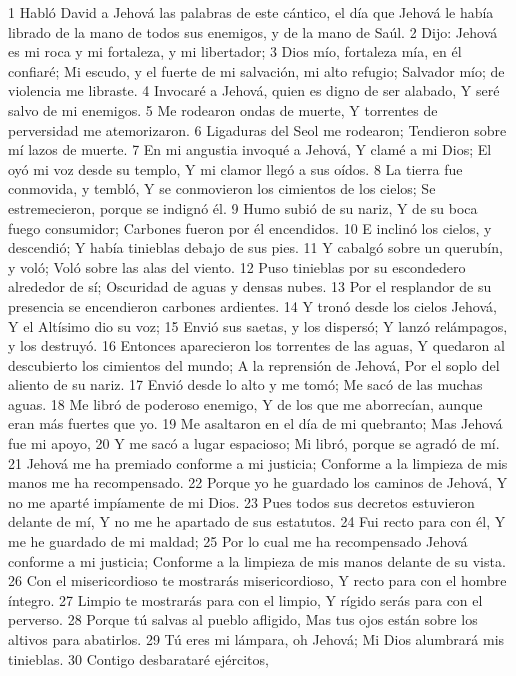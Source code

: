 1 Habló David a Jehová las palabras de este cántico, el día que Jehová le había librado de la mano de todos sus enemigos, y de la mano de Saúl.
2 Dijo:
Jehová es mi roca y mi fortaleza, y mi libertador;
3 Dios mío, fortaleza mía, en él confiaré;
Mi escudo, y el fuerte de mi salvación, mi alto refugio;
Salvador mío; de violencia me libraste.
4 Invocaré a Jehová, quien es digno de ser alabado,
Y seré salvo de mi enemigos.
5 Me rodearon ondas de muerte,
Y torrentes de perversidad me atemorizaron.
6 Ligaduras del Seol me rodearon;
Tendieron sobre mí lazos de muerte.
7 En mi angustia invoqué a Jehová,
Y clamé a mi Dios;
El oyó mi voz desde su templo,
Y mi clamor llegó a sus oídos.
8 La tierra fue conmovida, y tembló,
Y se conmovieron los cimientos de los cielos;
Se estremecieron, porque se indignó él.
9 Humo subió de su nariz,
Y de su boca fuego consumidor;
Carbones fueron por él encendidos.
10 E inclinó los cielos, y descendió;
Y había tinieblas debajo de sus pies.
11 Y cabalgó sobre un querubín, y voló;
Voló sobre las alas del viento.
12 Puso tinieblas por su escondedero alrededor de sí;
Oscuridad de aguas y densas nubes.
13 Por el resplandor de su presencia se encendieron carbones ardientes.
14 Y tronó desde los cielos Jehová,
Y el Altísimo dio su voz;
15 Envió sus saetas, y los dispersó;
Y lanzó relámpagos, y los destruyó.
16 Entonces aparecieron los torrentes de las aguas,
Y quedaron al descubierto los cimientos del mundo;
A la reprensión de Jehová,
Por el soplo del aliento de su nariz.
17 Envió desde lo alto y me tomó;
Me sacó de las muchas aguas.
18 Me libró de poderoso enemigo,
Y de los que me aborrecían, aunque eran más fuertes que yo.
19 Me asaltaron en el día de mi quebranto;
Mas Jehová fue mi apoyo,
20 Y me sacó a lugar espacioso;
Mi libró, porque se agradó de mí.
21 Jehová me ha premiado conforme a mi justicia;
Conforme a la limpieza de mis manos me ha recompensado.
22 Porque yo he guardado los caminos de Jehová,
Y no me aparté impíamente de mi Dios.
23 Pues todos sus decretos estuvieron delante de mí,
Y no me he apartado de sus estatutos.
24 Fui recto para con él,
Y me he guardado de mi maldad;
25 Por lo cual me ha recompensado Jehová conforme a mi justicia;
Conforme a la limpieza de mis manos delante de su vista.
26 Con el misericordioso te mostrarás misericordioso,
Y recto para con el hombre íntegro.
27 Limpio te mostrarás para con el limpio,
Y rígido serás para con el perverso.
28 Porque tú salvas al pueblo afligido,
Mas tus ojos están sobre los altivos para abatirlos. 
29 Tú eres mi lámpara, oh Jehová; 
Mi Dios alumbrará mis tinieblas.
30 Contigo desbarataré ejércitos,
